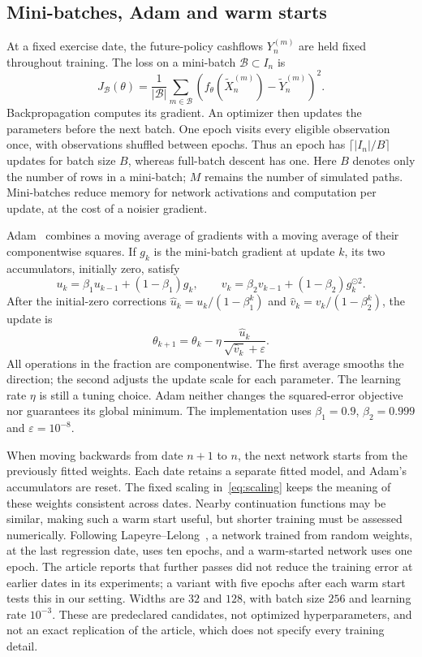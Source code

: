 \documentclass[11pt,a4paper]{article}
\begin{document}
\subsection{Mini-batches, Adam and warm starts}
At a fixed exercise date, the future-policy cashflows $Y_n^{(m)}$ are held fixed
throughout training. The loss on a mini-batch $\mathcal B\subset I_n$ is
\[
 J_{\mathcal B}(\theta)=\frac1{|\mathcal B|}\sum_{m\in\mathcal B}
 \left(f_\theta(\widetilde X_n^{(m)})-\widetilde Y_n^{(m)}\right)^2.
\]
Backpropagation computes its gradient. An optimizer then updates the parameters
before the next batch. One epoch visits every eligible observation once, with
observations shuffled between epochs. Thus an epoch has
$\lceil |I_n|/B\rceil$ updates for batch size $B$, whereas full-batch descent has
one. Here $B$ denotes only the number of rows in a mini-batch; $M$ remains the
number of simulated paths. Mini-batches reduce memory for network activations
and computation per update, at the cost of a noisier gradient.

Adam~\cite{Adam} combines a moving average of gradients with a moving average
of their componentwise squares. If $g_k$ is the mini-batch gradient at update $k$,
its two accumulators, initially zero, satisfy
\[
 u_k=\beta_1u_{k-1}+(1-\beta_1)g_k,\qquad
 v_k=\beta_2v_{k-1}+(1-\beta_2)g_k^{\odot2}.
\]
After the initial-zero corrections $\widehat u_k=u_k/(1-\beta_1^k)$ and
$\widehat v_k=v_k/(1-\beta_2^k)$, the update is
\[
 \theta_{k+1}=\theta_k-\eta\,
 \frac{\widehat u_k}{\sqrt{\widehat v_k}+\varepsilon}.
\]
All operations in the fraction are componentwise. The first average smooths the
direction; the second adjusts the update scale for each parameter. The learning
rate $\eta$ is still a tuning choice. Adam neither changes the squared-error
objective nor guarantees its global minimum. The implementation uses
$\beta_1=0.9$, $\beta_2=0.999$ and $\varepsilon=10^{-8}$.

When moving backwards from date $n+1$ to $n$, the next network starts from the
previously fitted weights. Each date retains a separate fitted model, and Adam's
accumulators are reset. The fixed scaling in~\eqref{eq:scaling} keeps the meaning
of these weights consistent across dates. Nearby continuation functions may be
similar, making such a warm start useful, but shorter training must be assessed
numerically. Following Lapeyre--Lelong~\cite{LL}, a network trained from random
weights, at the last regression date, uses ten epochs, and a warm-started network
uses one epoch. The article reports that further passes did not reduce the training
error at earlier dates in its experiments; a variant with five epochs after each
warm start tests this in our setting. Widths are $32$ and $128$, with batch size
$256$ and learning rate $10^{-3}$. These are predeclared candidates, not optimized
hyperparameters, and not an exact replication of the article, which does not
specify every training detail.
\end{document}
